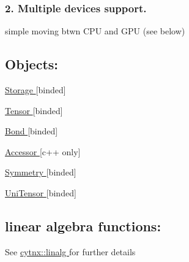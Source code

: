 \subsubsection*{2. Multiple devices support.}


\begin{DoxyItemize}
\item simple moving btwn C\+PU and G\+PU (see below)
\end{DoxyItemize}

\subsection*{Objects\+:}


\begin{DoxyItemize}
\item \hyperlink{classcytnx_1_1Storage}{Storage } \mbox{[}binded\mbox{]}
\item \hyperlink{classcytnx_1_1Tensor}{Tensor } \mbox{[}binded\mbox{]}
\item \hyperlink{classcytnx_1_1Bond}{Bond } \mbox{[}binded\mbox{]}
\item \hyperlink{classcytnx_1_1Accessor}{Accessor } \mbox{[}c++ only\mbox{]}
\item \hyperlink{classcytnx_1_1Symmetry}{Symmetry } \mbox{[}binded\mbox{]}
\item \hyperlink{classcytnx_1_1UniTensor}{Uni\+Tensor } \mbox{[}binded\mbox{]}
\end{DoxyItemize}

\subsection*{linear algebra functions\+:}

See \hyperlink{namespacecytnx_1_1linalg}{cytnx\+::linalg } for further details

